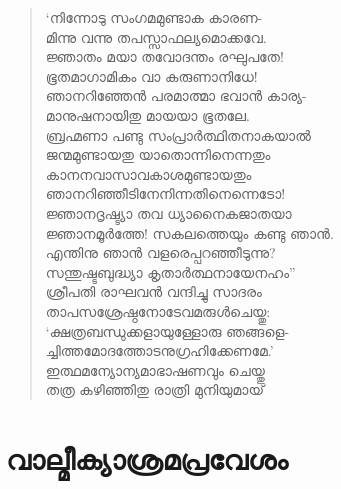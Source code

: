 \begin{verse}
‘നിന്നോടു സംഗമമുണ്ടാക കാരണ-\\
മിന്നു വന്നു തപസ്സാഫല്യമൊക്കവേ.\\
ജ്ഞാതം മയാ തവോദന്തം രഘുപതേ!\\
ഭൂതമാഗാമികം വാ കരുണാനിധേ!\\
ഞാനറിഞ്ഞേന്‍ പരമാത്മാ ഭവാന്‍ കാര്യ-\\
മാനുഷനായിതു മായയാ ഭൂതലേ.\\
ബ്രഹ്മണാ പണ്ടു സംപ്രാര്‍ത്ഥിതനാകയാല്‍\\
ജന്മമുണ്ടായതു യാതൊന്നിനെന്നതും\\
കാനനവാസാവകാശമുണ്ടായതും\\
ഞാനറിഞ്ഞീടിനേനിന്നതിനെന്നെടോ!\\
ജ്ഞാനദൃഷ്ട്യാ തവ ധ്യാനൈകജാതയാ\\
ജ്ഞാനമൂര്‍ത്തേ! സകലത്തെയും കണ്ടു ഞാന്‍.\\
എന്തിനു ഞാന്‍ വളരെപ്പറഞ്ഞീടുന്നു?\\
സന്തുഷ്ടബുദ്ധ്യാ കൃതാര്‍ത്ഥനായേനഹം”\\
ശ്രീപതി രാഘവന്‍ വന്ദിച്ചു സാദരം\\
താപസശ്രേഷ്ഠനോടേവമരുള്‍ചെയ്തു:\\
‘ക്ഷത്രബന്ധുക്കളായുള്ളോരു ഞങ്ങളെ-\\
ച്ചിത്തമോദത്തോടനുഗ്രഹിക്കേണമേ.’\\
ഇത്ഥമന്യോന്യമാഭാഷണവും ചെയ്തു\\
തത്ര കഴിഞ്ഞിതു രാത്രി മുനിയുമായ്
\end{verse}


\section{വാല്മീക്യാശ്രമപ്രവേശം}

